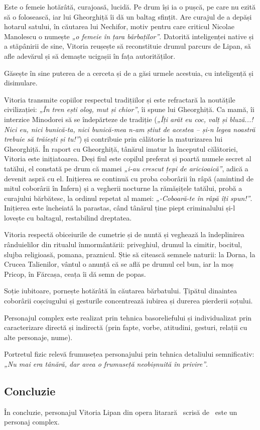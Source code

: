 Este o femeie hotărâtă, curajoasă, lucidă. Pe drum își ia o pușcă, pe care nu ezită să o folosească, iar lui Gheorghiță îi dă un baltag sfințit. Are curajul de a depăși hotarul satului, în căutarea lui Nechifor, motiv pentru care criticul Nicolae Manolescu o numește \textit{„o femeie în țara bărbaților”}. Datorită inteligenței native și a stăpânirii de sine, Vitoria reușește să reconstituie drumul parcurs de Lipan, să afle adevărul și să demaște ucigașii în fața autorităților.

Găsește în sine puterea de a cerceta și de a găsi urmele acestuia, cu inteligență și disimulare.

Vitoria transmite copiilor respectul tradițiilor și este refractară la noutățile civilizației: \textit{„În tren ești olog, mut și chior”}, îi spune lui Gheorghiță. Ca mamă, îi interzice Minodorei să se îndepărteze de tradiție (\textit{„Îți arăt eu coc, valț și bluză...! Nici eu, nici bunică-ta, nici bunică-mea n-am știut de acestea -- și-n legea noastră trebuie să trăiești și tu!”}) și contribuie prin călătorie la maturizarea lui Gheorghiță. În raport cu Gheorghiță, tânărul imatur la începutul călătoriei, Vitoria este inițiatoarea. Deși fiul este copilul preferat și poartă numele secret al tatălui, el constată pe drum că mamei \textit{„i-au crescut țepi de aricioaică”}, adică a devenit aspră cu el. Inițierea se continuă cu proba coborârii în râpă (amintind de mitul coborârii în Infern) și a vegherii nocturne la rămășițele tatălui, probă a curajului bărbătesc, la ordinul repetat al mamei: \textit{„-Coboară-te în râpă îți spun!”}. Inițierea este încheiată la parastas, când tânărul ține piept criminalului și-l lovește cu baltagul, restabilind dreptatea.

Vitoria respectă obiceiurile de cumetrie și de nuntă și veghează la îndeplinirea rânduielilor din ritualul înmormântării: priveghiul, drumul la cimitir, bocitul, slujba religioasă, pomana, praznicul. Știe să citească semnele naturii: la Dorna, la Crucea Talienilor, vântul o anunță că se află pe drumul cel bun, iar la moș Pricop, în Fărcașa, ceața îi dă semn de popas.

Soție iubitoare, pornește hotărâtă în căutarea bărbatului. Țipătul dinaintea coborârii coșciugului și gesturile concentrează iubirea și durerea pierderii soțului.

Personajul complex este realizat prin tehnica basoreliefului și individualizat prin caracterizare directă și indirectă (prin fapte, vorbe, atitudini, gesturi, relații cu alte personaje, nume).

Portretul fizic relevă frumusețea personajului prin tehnica detaliului semnificativ: \textit{„Nu mai era tânără, dar avea o frumuseță neobișnuită în privire”}.


\subsection{Concluzie}

În concluzie, personajul Vitoria Lipan din opera litarară \operatitle\ scrisă de \operaauthor\ este un personaj complex.

